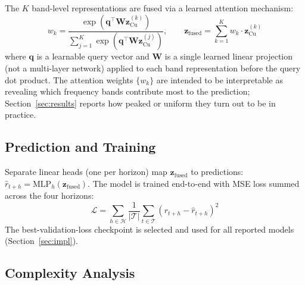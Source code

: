 \documentclass[journal]{IEEEtran}
\begin{document}
The $K$ band-level representations are fused via a learned attention mechanism:
\begin{equation}
w_k = \frac{\exp(\mathbf{q}^\top \mathbf{W}\mathbf{z}^{(k)}_{\text{Cu}})}{\sum_{j=1}^{K} \exp(\mathbf{q}^\top \mathbf{W}\mathbf{z}^{(j)}_{\text{Cu}})}, \qquad \mathbf{z}_{\text{fused}} = \sum_{k=1}^{K} w_k \cdot \mathbf{z}^{(k)}_{\text{Cu}}
\end{equation}
where $\mathbf{q}$ is a learnable query vector and $\mathbf{W}$ is a single learned linear projection (not a multi-layer network) applied to each band representation before the query dot product. The attention weights $\{w_k\}$ are intended to be interpretable as revealing which frequency bands contribute most to the prediction; Section~\ref{sec:results} reports how peaked or uniform they turn out to be in practice.

\subsection{Prediction and Training}

Separate linear heads (one per horizon) map $\mathbf{z}_{\text{fused}}$ to predictions:
$\hat{r}_{t+h} = \text{MLP}_h(\mathbf{z}_{\text{fused}})$. The model is trained end-to-end with MSE loss summed across the four horizons:
\begin{equation}
\mathcal{L} = \sum_{h \in \mathcal{H}} \frac{1}{|\mathcal{T}|} \sum_{t \in \mathcal{T}} (r_{t+h} - \hat{r}_{t+h})^2
\end{equation}
The best-validation-loss checkpoint is selected and used for all reported models (Section~\ref{sec:impl}).

\subsection{Complexity Analysis}
\label{sec:complexity}
\end{document}
